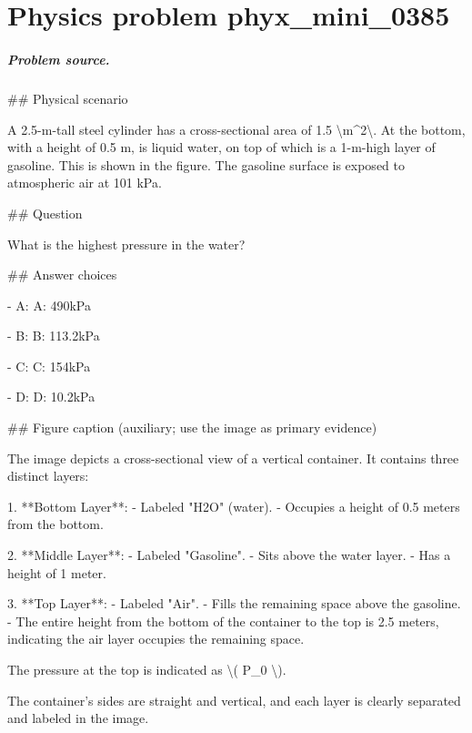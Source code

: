
\chapter{Physics problem phyx\_mini\_0385}
\label{ch:PhyXMiniProblems_problem_phyx_mini_0385}

\paragraph{Problem source.}
\#\# Physical scenario

A 2.5-m-tall steel cylinder has a cross-sectional area of 1.5 \textbackslash{}m\textasciicircum{}2\textbackslash{}. At the bottom, with a height of 0.5 m, is liquid water, on top of which is a 1-m-high layer of gasoline. This is shown in the figure. The gasoline surface is exposed to atmospheric air at 101 kPa.

\#\# Question

What is the highest pressure in the water?

\#\# Answer choices

- A: A: 490kPa

- B: B: 113.2kPa

- C: C: 154kPa

- D: D: 10.2kPa

\#\# Figure caption (auxiliary; use the image as primary evidence)

The image depicts a cross-sectional view of a vertical container. It contains three distinct layers:

1. **Bottom Layer**: 
   - Labeled "H2O" (water).
   - Occupies a height of 0.5 meters from the bottom.

2. **Middle Layer**: 
   - Labeled "Gasoline".
   - Sits above the water layer.
   - Has a height of 1 meter.

3. **Top Layer**: 
   - Labeled "Air".
   - Fills the remaining space above the gasoline.
   - The entire height from the bottom of the container to the top is 2.5 meters, indicating the air layer occupies the remaining space.

The pressure at the top is indicated as \textbackslash{}( P\_0 \textbackslash{}).

The container's sides are straight and vertical, and each layer is clearly separated and labeled in the image.

